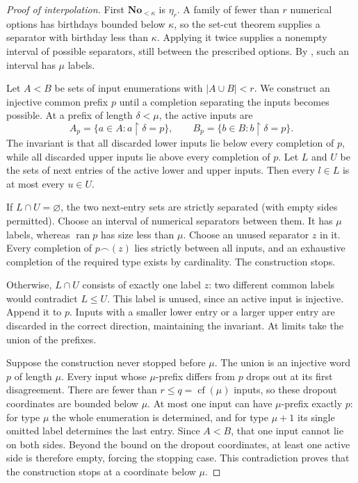 \documentclass[11pt]{article}
\theoremstyle{definition}
\theoremstyle{remark}
\newcommand{\No}{\mathbf{No}}
\begin{document}
\begin{proof}[Proof of interpolation]
First $\No_{<\kappa}$ is $\eta_r$.  A family of fewer than $r$ numerical
options has birthdays bounded below $\kappa$, so the set-cut theorem
supplies a separator with birthday less than $\kappa$.  Applying it
twice supplies a nonempty interval of possible separators, still
between the prescribed options.  By
, such an interval has $\mu$
labels.

Let $A<B$ be sets of input enumerations with $|A\cup B|<r$.  We
construct an injective common prefix $p$ until a completion separating
the inputs becomes possible.  At a prefix of length $\delta<\mu$,
the active inputs are
\[
 A_p=\{a\in A:a\restriction\delta=p\},\qquad
 B_p=\{b\in B:b\restriction\delta=p\}.
\]
The invariant is that all discarded lower inputs lie below every
completion of $p$, while all discarded upper inputs lie above every
completion of $p$.  Let $L$ and $U$ be the sets of next entries of the
active lower and upper inputs.  Then every $l\in L$ is at most every
$u\in U$.

If $L\cap U=\varnothing$, the two next-entry sets are strictly
separated (with empty sides permitted).  Choose an interval of
numerical separators between them.  It has $\mu$ labels, whereas
$\operatorname{ran}p$ has size less than $\mu$.  Choose an unused
separator $z$ in it.  Every completion of $p\frown(z)$ lies strictly
between all inputs, and an exhaustive completion of the required type
exists by cardinality.  The construction stops.

Otherwise, $L\cap U$ consists of exactly one label $z$: two different
common labels would contradict $L\leq U$.  This label is unused, since
an active input is injective.  Append it to $p$.  Inputs with a smaller
lower entry or a larger upper entry are discarded in the correct
direction, maintaining the invariant.  At limits take the union of
the prefixes.

Suppose the construction never stopped before $\mu$.  The union is an
injective word $p$ of length $\mu$.  Every input whose $\mu$-prefix
differs from $p$ drops out at its first disagreement.  There are fewer
than $r\leq q=\operatorname{cf}(\mu)$ inputs, so these dropout
coordinates are bounded below $\mu$.  At most one input can have
$\mu$-prefix exactly $p$: for type $\mu$ the whole enumeration is
determined, and for type $\mu+1$ its single omitted label determines
the last entry.  Since $A<B$, that one input cannot lie on both sides.
Beyond the bound on the dropout coordinates, at least one active side
is therefore empty, forcing the stopping case.  This contradiction
proves that the construction stops at a coordinate below $\mu$.
\end{proof}
\end{document}
